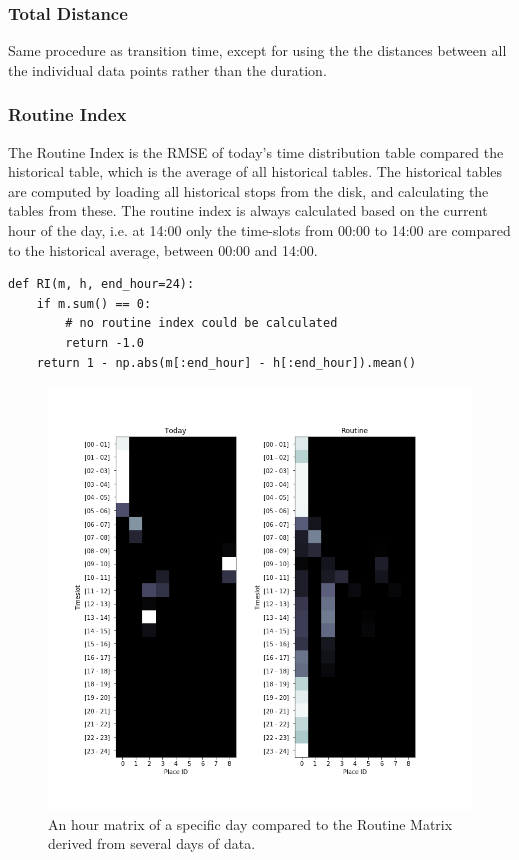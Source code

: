 \subsubsection{Total Distance} 
Same procedure as transition time, except for using the the distances between all the individual data points rather than the duration.

\subsubsection{Routine Index} 
The Routine Index is the RMSE of today's time distribution table compared the historical table, which is the average of all historical tables. The historical tables are computed by loading all historical stops from the disk, and calculating the tables from these. The routine index is always calculated based on the current hour of the day, i.e. at 14:00 only the time-slots from 00:00 to 14:00 are compared to the historical average, between 00:00 and 14:00. 

\begin{verbatim}
def RI(m, h, end_hour=24):
    if m.sum() == 0:
        # no routine index could be calculated
        return -1.0 
    return 1 - np.abs(m[:end_hour] - h[:end_hour]).mean()
\end{verbatim}

\begin{figure}
    \centering
    \includegraphics[width=\textwidth]{images/routine.png}
    \caption{An hour matrix of a specific day compared to the Routine Matrix derived from several days of data.}
    \label{fig:routine_example}
\end{figure}
